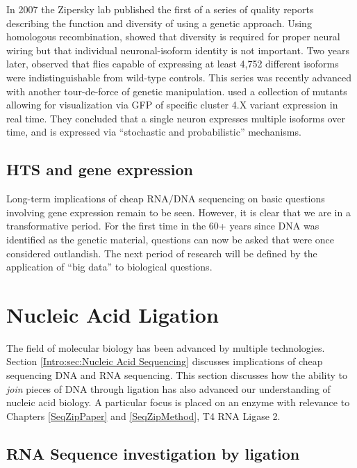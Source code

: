     In 2007 the Zipersky lab published \citep{Hattori2007} the first of a series of quality reports describing the function and diversity of \dscam{} using a genetic approach. Using homologous recombination, \citet{Hattori2007} showed that \dscam{} diversity is required for proper neural wiring but that individual neuronal-isoform identity is not important. Two years later, \citet{Hattori2009} observed that flies capable of expressing at least 4,752 different \dscam{} isoforms were indistinguishable from wild-type controls. This series was recently advanced with another tour-de-force of genetic manipulation. \citet{Miura2013b} used a collection of \dscam{} mutants allowing for visualization via GFP of specific cluster 4.X variant expression in real time. They concluded that a single neuron expresses multiple \dscam{} isoforms over time, and \dscam{} is expressed via ``stochastic and probabilistic'' mechanisms.

  \subsection{HTS and gene expression}\label{Intro:subsec:HTS and gene expression}

    Long-term implications of cheap RNA/DNA sequencing on basic questions involving gene expression remain to be seen. However, it is clear that we are in a transformative period. For the first time in the 60+ years since DNA was identified as the genetic material, questions can now be asked that were once considered outlandish. The next period of research will be defined by the application of ``big data'' to biological questions.

\section{Nucleic Acid Ligation}\label{Intro:sec:Nucleic Acid Ligation}

  The field of molecular biology has been advanced by multiple technologies. Section \ref{Intro:sec:Nucleic Acid Sequencing} discusses implications of cheap sequencing DNA and RNA sequencing. This section discusses how the ability to \textit{join} pieces of DNA through ligation has also advanced our understanding of nucleic acid biology. A particular focus is placed on an enzyme with relevance to Chapters \ref{SeqZipPaper} and \ref{SeqZipMethod}, T4 RNA Ligase 2.

  \subsection{RNA Sequence investigation by ligation}\label{Intro:subsec:Ligation}

